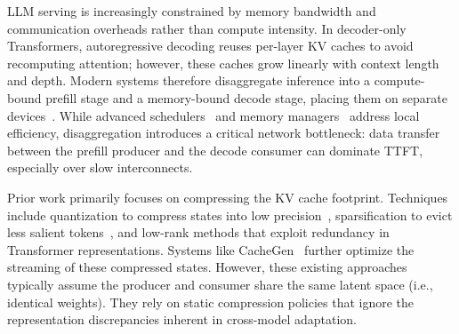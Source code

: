 \documentclass{article}
\theoremstyle{plain}
\theoremstyle{definition}
\theoremstyle{remark}
\begin{document}
LLM serving is increasingly constrained by memory bandwidth and communication overheads rather than compute intensity. In decoder-only Transformers, autoregressive decoding reuses per-layer KV caches to avoid recomputing attention; however, these caches grow linearly with context length and depth. Modern systems therefore disaggregate inference into a compute-bound prefill stage and a memory-bound decode stage, placing them on separate devices~\citep{qin2024mooncake,zhong2024distserve,patel2024splitwise}. While advanced schedulers~\citep{agrawal2024taming} and memory managers~\citep{kwon2023vllm} address local efficiency, disaggregation introduces a critical network bottleneck: data transfer between the prefill producer and the decode consumer can dominate TTFT, especially over slow interconnects.


Prior work primarily focuses on compressing the KV cache footprint. Techniques include quantization to compress states into low precision~\citep{liu2024kivi,hooper2024kvquant}, sparsification to evict less salient tokens~\citep{zhang2023h2o,li2024snapkv,tang2024quest,cai2024pyramidkv}, and low-rank methods that exploit redundancy in Transformer representations. Systems like CacheGen~\citep{liu2024cachegen} further optimize the streaming of these compressed states. However, these existing approaches typically assume the producer and consumer share the same latent space (i.e., identical weights). They rely on static compression policies that ignore the representation discrepancies inherent in cross-model adaptation.
\end{document}
